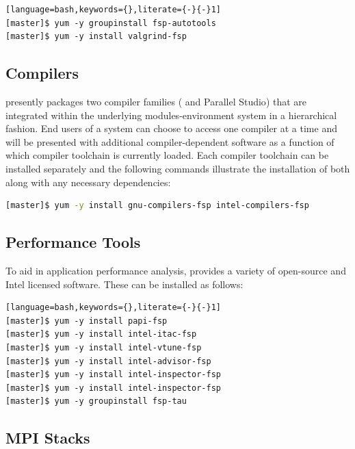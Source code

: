 \documentclass[letterpaper]{article}
\begin{document}
\begin{lstlisting}[language=bash,keywords={},literate={-}{-}1]
[master]$ yum -y groupinstall fsp-autotools
[master]$ yum -y install valgrind-fsp
\end{lstlisting}

\subsection{Compilers}

\FSP{} presently packages two compiler families ({\GNU{}} and {\Intel{}
  Parallel Studio}) that are integrated within the underlying
modules-environment system in a hierarchical fashion. End users of a \FSP{}
system can choose to access one compiler at a time and will be presented with
additional compiler-dependent software as a function of which compiler
toolchain is currently loaded. Each compiler toolchain can be installed
separately and the following commands illustrate the installation of both along
with any necessary dependencies:

\begin{lstlisting}[language=bash]
[master]$ yum -y install gnu-compilers-fsp intel-compilers-fsp
\end{lstlisting}

\subsection{Performance Tools}

To aid in application performance analysis, \FSP{} provides a variety of
open-source and Intel licensed software. These can be installed as follows:

\begin{lstlisting}[language=bash,keywords={},literate={-}{-}1]
[master]$ yum -y install papi-fsp
[master]$ yum -y install intel-itac-fsp
[master]$ yum -y install intel-vtune-fsp
[master]$ yum -y install intel-advisor-fsp
[master]$ yum -y install intel-inspector-fsp
[master]$ yum -y install intel-inspector-fsp
[master]$ yum -y groupinstall fsp-tau
\end{lstlisting}

\subsection{MPI Stacks} \label{sec:mpi}
\end{document}

